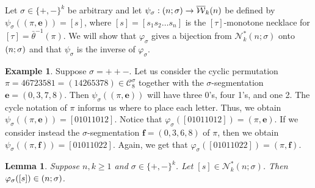 \documentclass[12pt]{article}
\let\SS\relax
\DeclareMathOperator{\SS}{Seg}
\renewcommand{\S}{\mathcal{S}}
\newcommand{\C}{\mathcal{C}}
\newcommand{\N}{\mathcal{N}}
\newcommand{\W}{\mathcal{W}}
\newcommand{\e}{\mathbf{e}}
\theoremstyle{plain}
\newtheorem{lemma}[theorem]{Lemma}
\theoremstyle{definition}
\newtheorem{example}[theorem]{Example}
\begin{document}
Let $\sigma\in\{+,-\}^k$ be arbitrary and let $\psi_\sigma:\SS(n;\sigma) \to \overline{\W}_k(n)$ be defined by $\psi_\sigma((\pi, \e)) = [s]$, where $[s]=[s_1s_2\ldots s_n]$ is the $[\tau]$-monotone necklace for $[\tau]=\bar\theta^{-1}(\pi)$.
%
We will show that $\varphi_\sigma$ gives a bijection from $\N^*_k(n;\sigma)$ onto $\SS(n;\sigma)$ and that $\psi_\sigma$ is the inverse of $\varphi_\sigma$. 

\begin{example}
Suppose $\sigma = ++-$. Let us consider the cyclic permutation $\pi = 46723581= (14265378)\in \C_8^\sigma$ together with the $\sigma$-segmentation $\e=(0,3,7,8)$. Then $\psi_\sigma((\pi,\e))$ will have three 0's, four 1's, and one 2. The cycle notation of $\pi$ informs us where to place each letter. Thus, we obtain $\psi_\sigma((\pi,\e))=[01011012]$. Notice that $\varphi_\sigma([01011012]) = (\pi,\e)$. If we consider instead the $\sigma$-segmentation $\mathbf{f}=(0,3,6,8)$ of $\pi$, then we obtain $\psi_\sigma((\pi,\mathbf{f}))=[01011022]$. Again, we get that $\varphi_\sigma([01011022]) = (\pi,\mathbf{f})$.
\end{example}

\begin{lemma} \label{lem: ppat}
Suppose $n,k\geq 1$ and $\sigma\in\{+,-\}^k$. Let $[s]\in \N^*_k(n;\sigma)$. Then $\varphi_\sigma([s]) \in \SS(n;\sigma)$. 
\end{lemma}
\end{document}

